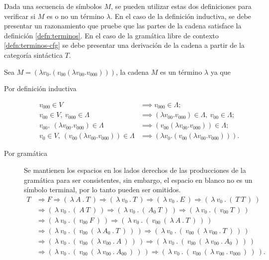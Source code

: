 Dada una secuencia de símbolos \( M \), se pueden utilizar estas dos definiciones para verificar si \( M \) es o no un término \( λ \). En el caso de la definición inductiva, se debe presentar un razonamiento que pruebe que las partes de la cadena satisface la definición \ref{defn:terminos}. En el caso de la gramática libre de contexto \ref{defn:terminos-cfg} se debe presentar una derivación de la cadena a partir de la categoría sintáctica \( T \).

\begin{exmp} Sea \( M = (λv_{0}.(v_{00} (λv_{00}.v_{000}))) \), la cadena \( M \) es un término \( λ \) ya que

  \begin{description}
  \item[Por definición inductiva]
    \begin{align*}
      v_{000} \in V &\implies v_{000} \in Λ; \\
      v_{00} \in V,\ v_{000} \in Λ &\implies (λv_{00}.v_{000}) \in Λ,\ v_{00} \in Λ; \\
      v_{00},\ (λv_{00}.v_{000}) \in Λ &\implies (v_{00} (λv_{00}.v_{000})) \in Λ; \\
      v_{0} \in V,\ (v_{00} (λv_{00}.v_{000})) \in Λ &\implies (λv_{0}.(v_{00} (λv_{00}.v_{000}))).
    \end{align*}
  \item[Por gramática] Se mantienen los espacios en los lados derechos de las producciones de la gramática para ser consistentes, sin embargo, el espacio en blanco no es un símbolo terminal, por lo tanto pueden ser omitidos.
    \begin{align*}
      T &\Rightarrow F \Rightarrow (\ λ\ A\ .\ T\ ) \Rightarrow (\ λ\ v_{0}\ .\ T\ ) \Rightarrow (\ λ\ v_{0}\ .\ E\ ) \Rightarrow (\ λ\ v_{0}\ .\ (\ T\ T\ )\ ) \\
        &\Rightarrow (\ λ\ v_{0}\ .\ (\ A\ T\ )\ ) \Rightarrow (\ λ\ v_{0}\ .\ (\ A_{0}\ T\ )\ ) \Rightarrow (\ λ\ v_{0}\ .\ (\ v_{00}\ T\ )\ ) \\
        &\Rightarrow (\ λ\ v_{0}\ .\ (\ v_{00}\ F\ )\ ) \Rightarrow (\ λ\ v_{0}\ .\ (\ v_{00}\ (\ λ\ A\ .\ T\ )\ )\ ) \\
        &\Rightarrow (\ λ\ v_{0}\ .\ (\ v_{00}\ (\ λ\ A_{0}\ .\ T\ )\ )\ ) \Rightarrow (\ λ\ v_{0}\ .\ (\ v_{00}\ (\ λ\ v_{00}\ .\ T\ )\ )\ ) \\
        &\Rightarrow (\ λ\ v_{0}\ .\ (\ v_{00}\ (\ λ\ v_{00}\ .\ A\ )\ )\ ) \Rightarrow (\ λ\ v_{0}\ .\ (\ v_{00}\ (\ λ\ v_{00}\ .\ A_{0}\ )\ )\ ) \\
        &\Rightarrow (\ λ\ v_{0}\ .\ (\ v_{00}\ (\ λ\ v_{00}\ .\ A_{00}\ )\ )\ ) \Rightarrow (\ λ\ v_{0}\ .\ (\ v_{00}\ (\ λ\ v_{00}\ .\ v_{000}\ )\ )\ ).
    \end{align*}
  \end{description}
\end{exmp}

